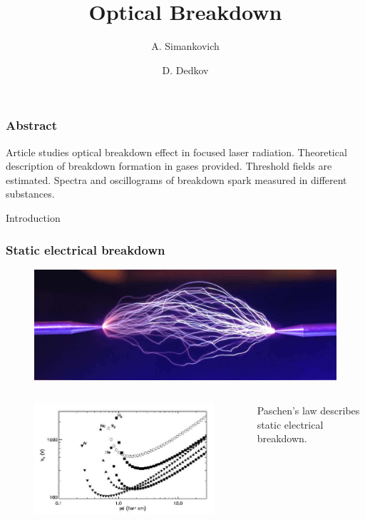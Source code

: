\documentclass{beamer}
\title[About Beamer] %
{Optical Breakdown}
\author[Arthur, Doe] %
{A. Simankovich \and D. Dedkov }
\institute[VFU] %
{
	Moscow Institute of Physics and Technology
}
\date[VLC 2023] %
\begin{document}
	
	\frame{\titlepage}
	
	\begin{frame}
		\frametitle{Abstract}
		
		Article studies optical breakdown effect in focused laser radiation. Theoretical description of breakdown formation in gases provided. Threshold fields are estimated. Spectra and oscillograms of breakdown spark measured in different substances.
	\end{frame}
	
	
	\begin{frame}[plain,c]
		
		\begin{center}
			\huge {} Introduction
		\end{center}
		
	\end{frame}
	
	
	\begin{frame}
		\frametitle{Static electrical breakdown}
		
		\begin{figure}
			\includegraphics[width=0.8\linewidth]{res/const_discharge.jpg}
		\end{figure}
		
		\begin{columns}
			\begin{figure}
				\includegraphics[width=\linewidth]{res/paschen.jpg}
			\end{figure}
			
			Paschen's law describes static electrical breakdown.
		\end{columns}
		
	\end{frame}
	
\end{document}
